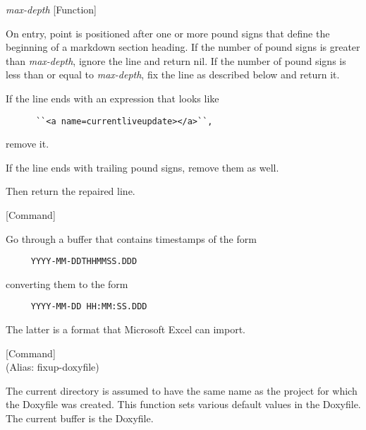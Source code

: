 \vspace{1em}
\noindent
{}
\usebox{\funcname}\emph{max-depth}
 \hfill [Function]

\begin{doc-string}
On entry, point is positioned after one or more pound signs that define the
beginning of a markdown section heading.  If the number of pound signs is
greater than \emph{max-depth}, ignore the line and return nil.  If the number of
pound signs is less than or equal to \emph{max-depth}, fix the line as described
below and return it.

If the line ends with an expression that looks like

\small{\begin{verbatim}
      ``<a name=currentliveupdate></a>``,
\end{verbatim}}

remove it.

If the line ends with trailing pound signs, remove them as well.

Then return the repaired line.
\end{doc-string}

\vspace{1em}
\noindent
{}
\usebox{\funcname}
 \hfill [Command]

\begin{doc-string}
Go through a buffer that contains timestamps of the form
\small{\begin{verbatim}
     YYYY-MM-DDTHHMMSS.DDD
\end{verbatim}}
converting them to the form
\small{\begin{verbatim}
     YYYY-MM-DD HH:MM:SS.DDD
\end{verbatim}}
The latter is a format that Microsoft Excel can import.
\end{doc-string}

\vspace{1em}
\noindent
{}
\usebox{\funcname}
 \hfill [Command]\\%
 (Alias: fixup-doxyfile)

\begin{doc-string}
The current directory is assumed to have the same name as the project for
which the Doxyfile was created.  This function sets various default values in
the Doxyfile.  The current buffer is the Doxyfile.
\end{doc-string}

